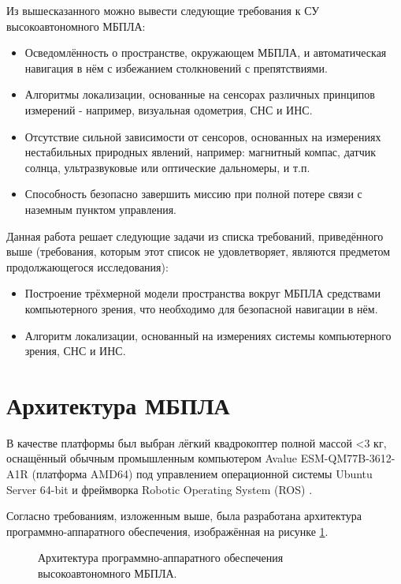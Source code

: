 \documentclass[11pt,a4paper]{article}
\begin{document}
Из вышесказанного можно вывести следующие требования к СУ высокоавтономного МБПЛА:

\begin{itemize}
    \item Осведомлённость о пространстве, окружающем МБПЛА, и автоматическая навигация в нём с избежанием столкновений с препятствиями.
    \item Алгоритмы локализации, основанные на сенсорах различных принципов измерений - например, визуальная одометрия, СНС и ИНС.
    \item Отсутствие сильной зависимости от сенсоров, основанных на измерениях нестабильных природных явлений, например: магнитный компас, датчик солнца, ультразвуковые или оптические дальномеры, и т.п.
    \item Способность безопасно завершить миссию при полной потере связи с наземным пунктом управления.
\end{itemize}

Данная работа решает следующие задачи из списка требований, приведённого выше (требования, которым этот список не удовлетворяет, являются предметом продолжающегося исследования):

\begin{itemize}
    \item Построение трёхмерной модели пространства вокруг МБПЛА средствами компьютерного зрения, что необходимо для безопасной навигации в нём.
    \item Алгоритм локализации, основанный на измерениях системы компьютерного зрения, СНС и ИНС.
\end{itemize}

\section{Архитектура МБПЛА}

В качестве платформы был выбран лёгкий квадрокоптер полной массой <3 кг, оснащённый обычным промышленным компьютером Avalue ESM-QM77B-3612-A1R (платформа AMD64) под управлением операционной системы Ubuntu Server 64-bit и фреймворка Robotic Operating System (ROS) \cite{ROS}.

Согласно требованиям, изложенным выше, была разработана архитектура программно-аппаратного обеспечения, изображённая на рисунке \ref{fig:arch}.

\begin{figure}[!htbp]
    \centering
    
    \caption{\label{fig:arch}Архитектура программно-аппаратного обеспечения высокоавтономного МБПЛА.}
\end{figure}
\end{document}
